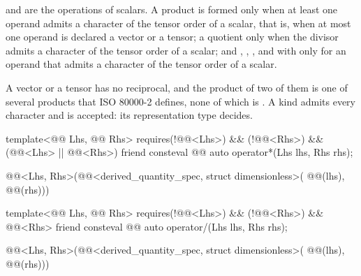 \pnum
\tcode{*} and \tcode{/} are the operations of scalars.
A product is formed only when at least one operand admits a character of the tensor order of a scalar,
that is, when at most one operand is declared a vector or a tensor;
a quotient only when the divisor admits a character of the tensor order of a scalar;
and , , , and  with 
only for an operand that admits a character of the tensor order of a scalar.
\begin{note}
A vector or a tensor has no reciprocal,
and the product of two of them is one of several products that ISO 80000-2 defines, none of which is \tcode{*}.
A kind admits every character and is accepted: its representation type decides.
\end{note}

\begin{itemdecl}
template<@@ Lhs, @@ Rhs>
  requires(!@@<Lhs>) && (!@@<Rhs>) &&
          (@@<Lhs> || @@<Rhs>)
friend consteval @@ auto operator*(Lhs lhs, Rhs rhs);
\end{itemdecl}

\begin{itemdescr}
\pnum
\returns
\begin{codeblock}
@@<Lhs{}, Rhs{}>(@@<derived_quantity_spec, struct dimensionless>(
  @@(lhs), @@(rhs)))
\end{codeblock}
\end{itemdescr}

\begin{itemdecl}
template<@@ Lhs, @@ Rhs>
  requires(!@@<Lhs>) && (!@@<Rhs>) &&
          @@<Rhs>
friend consteval @@ auto operator/(Lhs lhs, Rhs rhs);
\end{itemdecl}

\begin{itemdescr}
\pnum
\returns
\begin{codeblock}
@@<Lhs{}, Rhs{}>(@@<derived_quantity_spec, struct dimensionless>(
  @@(lhs), @@(rhs)))
\end{codeblock}
\end{itemdescr}

